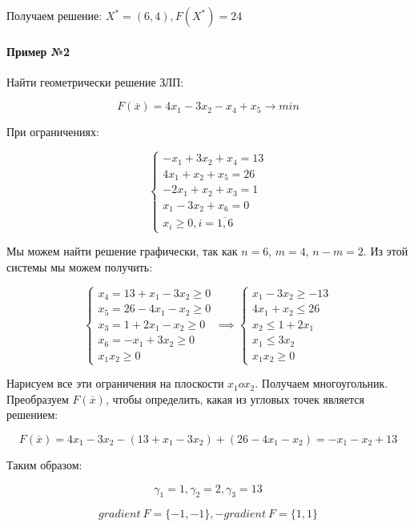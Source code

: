 \documentclass{article}
\begin{document}
Получаем решение: $X^{*} = (6, 4), F(X^{*}) = 24$

\paragraph{Пример №2}

Найти геометрически решение ЗЛП:

$$
F(\overline{x}) = 4x_1 - 3x_2 - x_4 + x_5 \to min
$$

При ограничениях:

$$
\begin{cases}
    -x_1 + 3x_2 + x_4 = 13 \\
    4x_1 + x_2 + x_5 = 26 \\
    -2x_1 + x_2 + x_3 = 1 \\
    x_1 - 3x_2 + x_6 = 0 \\
    x_{i} \ge 0, i = \overline{1, 6}    
\end{cases}
$$

Мы можем найти решение графически, так как $n = 6$, $m = 4$, $n - m = 2$. Из этой системы мы можем получить:

$$
\begin{cases}
  x_4 = 13 + x_{1} - 3x_{2} \ge 0 \\
  x_5 = 26 - 4x_1 - x_2 \ge 0 \\
  x_3 = 1 + 2x_1 - x_2 \ge 0 \\
  x_6 = -x_1 + 3x_2 \ge 0 \\
  x_1 x_2 \ge 0  
\end{cases} \implies
\begin{cases}
    x_1 - 3x_2 \ge -13 \\
    4x_1 + x_2 \le 26 \\
    x_2 \le 1 + 2x_1\\
    x_1 \le 3x_2 \\
    x_1 x_2 \ge 0
\end{cases}
$$

Нарисуем все эти ограничения на плоскости $x_1 o x_2$. Получаем многоугольник. Преобразуем $F(\overline{x})$, чтобы определить, какая из угловых точек является решением:

$$
F(\overline{x}) = 4x_1 - 3x_2 - (13 + x_1 - 3x_2) + (26 - 4x_1 - x_2) = -x_1 - x_2 + 13
$$

Таким образом:

$$
\gamma_1 = 1, \gamma_2 = 2, \gamma_3 = 13
$$

$$
gradient \ F = \{ -1, -1 \}, - gradient \ F = \{ 1, 1 \}
$$
\end{document}
